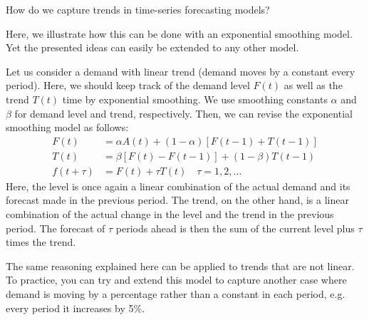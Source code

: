 \begin{exercise}
How do we capture trends in time-series forecasting models?


  \begin{solution}   
   Here, we illustrate how this can be done with an exponential smoothing model. Yet the presented ideas can easily be extended to any other model. 
 
   Let us consider a demand with linear trend (demand moves by a constant every period). Here, we should keep track of the demand level $F(t)$ as well as the trend $T(t)$ time by exponential smoothing. We use smoothing constants $\alpha$ and $\beta$ for demand level and trend, respectively. Then, we can revise the exponential smoothing model as follows:
\begin{align*}
F(t) & = \alpha A(t) + (1-\alpha) [F(t-1)+T(t-1)] \\
T(t) & = \beta [F(t)-F(t-1)] + (1-\beta) T(t-1) \\
f(t+\tau) & = F(t) + \tau T(t) \quad \tau = 1,2,\ldots
\end{align*}
Here, the level is once again a linear combination of the actual demand and its forecast made in the previous period. The trend, on the other hand, is a linear combination of the actual change in the level and the trend in the previous period. The forecast of $\tau$ periods ahead is then the sum of the current level plus $\tau$ times the trend. 

The same reasoning explained here can be applied to trends that are not linear. To practice, you can try and extend this model to capture another case where demand is moving by a percentage rather than a constant in each period, e.g. every period it increases by 5\%. 

  \end{solution}
\end{exercise}
  
